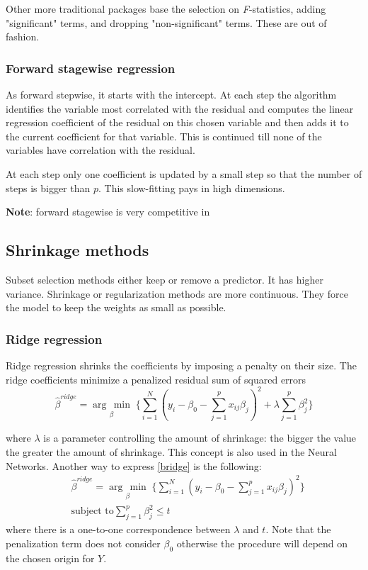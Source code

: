\documentclass[12pt, letterpaper]{article}
\theoremstyle{definition}
\newcommand{\argmin}[1]{\underset{#1}{\operatorname{arg}\,\operatorname{min}}\;}
\begin{document}
Other more traditional packages base the selection on \textit{F}-statistics, adding "significant" terms, and dropping "non-significant" terms. These are out of fashion.

\subsubsection{Forward stagewise regression}
As forward stepwise, it starts with the intercept. At each step the algorithm identifies the variable most correlated with the residual and computes the linear regression coefficient of the residual on this chosen variable and then adds it to the current coefficient for that variable. This is continued till none of the variables have correlation with the residual.

At each step only one coefficient is updated by a small step so that the number of steps is bigger than $p$. This slow-fitting pays in high dimensions.

\textbf{Note}: forward stagewise is very competitive in 

\subsection{Shrinkage methods}
Subset selection methods either keep or remove a predictor. It has higher variance. Shrinkage or regularization methods are more continuous. They force the model to keep the weights as small as possible.


\subsubsection{Ridge regression}
Ridge regression shrinks the coefficients by imposing a penalty on their size.	 The ridge coefficients minimize a penalized residual sum of squared errors
\begin{equation}
\label{bridge}
\hat{\beta}^{ridge} = \argmin{\beta} \Bigg\lbrace \sum_{i=1}^N \left( y_i -  \beta_0 - \sum_{j=1}^p x_{ij} \beta_j\right)^2+ \lambda \sum_{j=1}^p \beta_j^2 \Bigg\rbrace
\end{equation}

where $\lambda$ is a parameter controlling the amount of shrinkage: the bigger the value the greater the amount of shrinkage. This concept is also used in the Neural Networks. Another way to express \ref{bridge} is the following:
\begin{equation}
\begin{aligned}
&\hat{\beta}^{ridge} = \argmin{\beta} \Bigg\lbrace \sum_{i=1}^N \left( y_i -  \beta_0 - \sum_{j=1}^p x_{ij} \beta_j\right)^2 \Bigg\rbrace\\
&\text{subject to} \sum_{j=1}^p \beta_j^2 \le t
\end{aligned}
\end{equation}
where there is a one-to-one correspondence between $\lambda$ and $t$. Note that the penalization term does not consider $\beta_0$ otherwise the procedure will depend on the chosen origin for $Y$.
\end{document}
